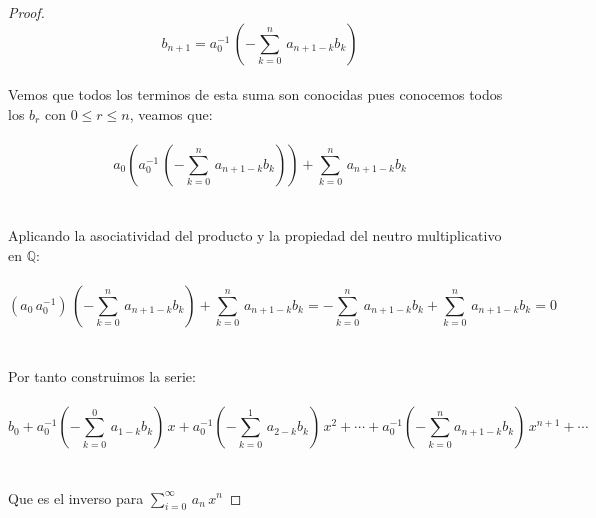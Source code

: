 \documentclass[11pt,letterpaper]{article}
\newcommand{\Q}{\mathbb{Q}}
\begin{document}
\begin{proof}
    \,\\
    \begin{equation*}
        b_{n+1}=a_0^{-1}\,\left(-\sum_{k=0}^{n}\,a_{n+1-k}b_k\right)
    \end{equation*}\,\\
    Vemos que todos los terminos de esta suma son conocidas pues conocemos todos los $b_r$ con $0\leq r\leq n$, veamos que:\,\\
    \,\\
    \begin{equation*}
        a_0\left(a_0^{-1}\,\left(-\sum_{k=0}^{n}\,a_{n+1-k}b_k\right)\right)+\sum_{k=0}^{n}\,a_{n+1-k}b_k
    \end{equation*}\,\\
    \,\\
    Aplicando la asociatividad del producto y la propiedad del neutro multiplicativo  en $\Q$:\,\\
    \,\\
    \begin{equation*}
        (a_0\,a_0^{-1})\,\left(-\sum_{k=0}^{n}\,a_{n+1-k}b_k\right)+\sum_{k=0}^{n}\,a_{n+1-k}b_k=-\sum_{k=0}^{n}\,a_{n+1-k}b_k+\sum_{k=0}^{n}\,a_{n+1-k}b_k=0
    \end{equation*}\,\\
    \,\\
    Por tanto construimos la serie:\,\\
    \,\\
    \begin{equation*}
        b_0+a_0^{-1}\left(-\sum_{k=0}^{0}\,a_{1-k}b_k\right)\,x+a_0^{-1}\left(-\sum_{k=0}^{1}\,a_{2-k}b_k\right)\,x^2+\cdots+a_0^{-1}\left(-\sum_{k=0}^n a_{n+1-k}b_{k}\right)\,x^{n+1}+\cdots
    \end{equation*}\,\\
    \,\\
    Que es el inverso para $\displaystyle\sum_{i=0}^{\infty}\,a_n\,x^n$
    
\end{proof}
\end{document}
